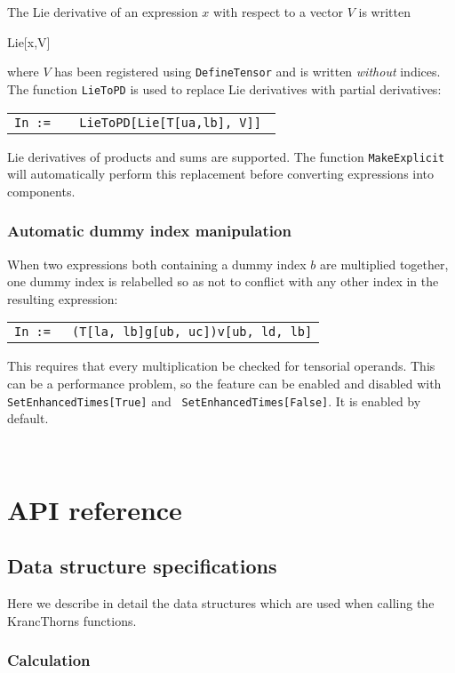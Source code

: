 \documentclass{report}
\newcommand{\mathdialogue}[2]
{
  \begin{center}
  \begin{tabular}[t]{rl}
  {\tt In := } & \parbox{10cm}{\tt {#1}} \\
\\
  {\tt Out = } & \parbox{10cm}{#2} \\
  \end{tabular}
  \end{center}
}
\newcommand{\mathinput}[1]
{
  \begin{tt}
  \begin{center}
    #1
  \end{center}
  \end{tt}
}
\newcommand{\Tud}[3]{  #1 ^#2 _{\phantom{#2} #3}}
\begin{document}
The Lie derivative of an expression $x$ with respect to a vector $V$ is
written
\mathinput{Lie[x,V]}
where $V$ has been registered using {\tt DefineTensor} and is written {\em without}
indices.  The function {\tt LieToPD} is used to replace Lie derivatives
with partial derivatives:
\mathdialogue
{
  LieToPD[Lie[T[ua,lb], V]]
}
{
  $\Tud T a {b,c} V^c + \Tud T a c \Tud V c {,b} - \Tud T c b V^a_{,c}$
}
%
Lie derivatives of products and sums are supported.
%
The function {\tt MakeExplicit} will automatically perform this replacement
before converting expressions into components.


\subsection{Automatic dummy index manipulation}

When two expressions both containing a dummy index $b$ are multiplied
together, one dummy index is relabelled so as not to conflict with any
other index in the resulting expression:

\mathdialogue
{(T[la, lb]g[ub, uc])v[ub, ld, lb]}
{$T_{ab} g^{bc} V^e_{\phantom{e}de}$}
%
This requires that every multiplication be checked for tensorial
operands.  This can be a performance problem, so the feature can be
enabled and disabled with {\tt SetEnhancedTimes[True]} and {\tt
SetEnhancedTimes[False]}.  It is enabled by default.















\



\chapter{API reference}

\section{Data structure specifications}
\label{app:data_structures}

Here we describe in detail the data structures which are used when
calling the KrancThorns functions.

\subsection{Calculation}
\label{app:Calculation}
\end{document}
